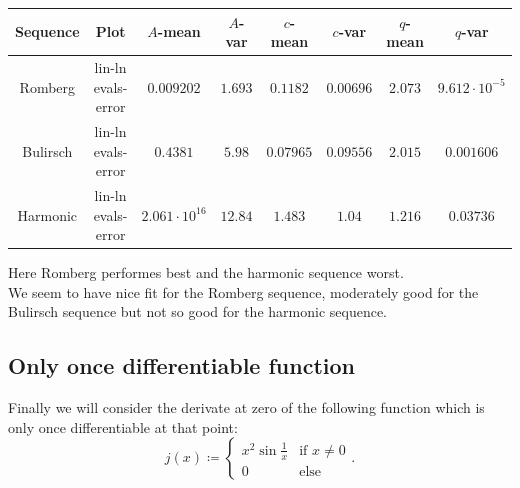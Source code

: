 \begin{table}[H]
    \centering
    \small
    \begin{tabular}{c|c||c|c|c|c|c|c}
Sequence & Plot & \(A\)-mean & \(A\)-var & \(c\)-mean & \(c\)-var & \(q\)-mean & \(q\)-var\\\hline
\rowcolor{green}
Romberg & lin-ln evals-error & \(0.009202\) & \(1.693\) & \(0.1182\) & \(0.00696\) & \(2.073\) & \(9.612\cdot 10^{-5}\) \\
\rowcolor{yellow}
Bulirsch & lin-ln evals-error & \(0.4381\) & \(5.98\) & \(0.07965\) & \(0.09556\) & \(2.015\) & \(0.001606\) \\
\rowcolor{red}
Harmonic & lin-ln evals-error & \(2.061\cdot 10^{16}\) & \(12.84\) & \(1.483\) & \(1.04\) & \(1.216\) & \(0.03736\) \\
    \end{tabular}
    \label{tab:my_label}
\end{table}

Here Romberg performes best and the harmonic sequence worst.\\

We seem to have nice fit for the Romberg sequence, moderately good for the Bulirsch sequence but not so good for the harmonic sequence.

\subsection{Only once differentiable function}

Finally we will consider the derivate at zero of the following function which is only once differentiable at that point:
\[
j(x)\coloneqq \begin{cases}
x^2\sin\frac{1}{x} & \text{if } x \neq 0\\
0 & \text{else}
\end{cases}.
\]

